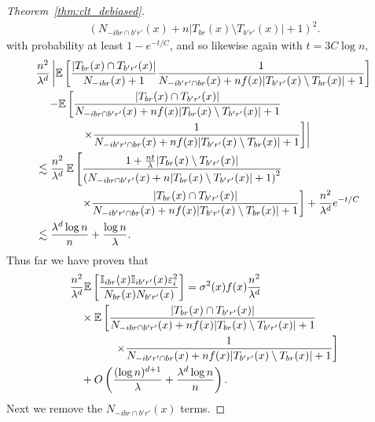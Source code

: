 \begin{proof}[Theorem~\ref{thm:clt_debiased}]
\begin{align*}
    {\left(N_{-i b r \cap b' r'}(x)
    + n |T_{b r}(x) \setminus T_{b' r'}(x)|+1\right)^2}.
  \end{align*}
  with probability at least $1 - e^{-t/C}$,
  and so likewise again with $t = 3 C \log n$,
  \begin{align*}
    &\frac{n^2}{\lambda^d}
    \left|
    \mathbb{E} \left[
      \frac{|T_{b r}(x) \cap T_{b' r'}(x)|}{N_{-i b r}(x)+1}
      \frac{1}
      {N_{-i b' r' \cap b r}(x)+n f(x) |T_{b' r'}(x) \setminus T_{b r}(x)|+1}
    \right]
    \right.
    \\
    &\left.
    \quad-
    \mathbb{E} \left[
      \frac{|T_{b r}(x) \cap T_{b' r'}(x)|}
      {N_{-i b r \cap b' r'}(x) + n f(x) |T_{b r}(x) \setminus T_{b' r'}(x)|+1}
      \right.\right. \\
      &\qquad\qquad\left.\left.
      \times
      \frac{1}
      {N_{-i b' r' \cap b r}(x)+n f(x) |T_{b' r'}(x) \setminus T_{b r}(x)|+1}
    \right]
    \right| \\
    &\lesssim
    \frac{n^2}{\lambda^d} \,
    \mathbb{E} \left[
      \frac{1 + \frac{n t}{\lambda} |T_{b r}(x) \setminus T_{b' r'}(x)|}
      {\left(N_{-i b r \cap b' r'}(x)
      + n |T_{b r}(x) \setminus T_{b' r'}(x)|+1\right)^2}
      \right. \\
      &\qquad\qquad\left.
      \times
      \frac{|T_{b r}(x) \cap T_{b' r'}(x)|}
      {N_{-i b' r' \cap b r}(x)+n f(x) |T_{b' r'}(x) \setminus T_{b r}(x)|+1}
    \right]
    + \frac{n^2}{\lambda^d}
    e^{-t/C} \\
    &\lesssim
    \frac{\lambda^d \log n}{n}
    + \frac{\log n}{\lambda}.
  \end{align*}
  Thus far we have proven that
  \begin{align*}
    &\frac{n^2}{\lambda^d}
    \mathbb{E} \left[
      \frac{\mathbb{I}_{i b r}(x) \mathbb{I}_{i b' r'}(x) \varepsilon_i^2}
      {N_{b r}(x) N_{b' r'}(x)}
    \right]
    = \sigma^2(x)
    f(x)
    \frac{n^2}{\lambda^d} \\
    &\quad\times
    \mathbb{E} \left[
      \frac{|T_{b r}(x) \cap T_{b' r'}(x)|}
      {N_{-i b r \cap b' r'}(x) + n f(x) |T_{b r}(x) \setminus T_{b' r'}(x)|+1}
      \right. \\
      &\left.
      \qquad\qquad
      \times
      \frac{1}
      {N_{-i b' r' \cap b r}(x)+n f(x) |T_{b' r'}(x) \setminus T_{b r}(x)|+1}
    \right] \\
    &\quad+
    O \left(
      \frac{(\log n)^{d+1}}{\lambda}
      + \frac{\lambda^d \log n}{n}
    \right).
  \end{align*}
  Next we remove the $N_{-i b r \cap b' r'}(x)$ terms.

\end{proof}
